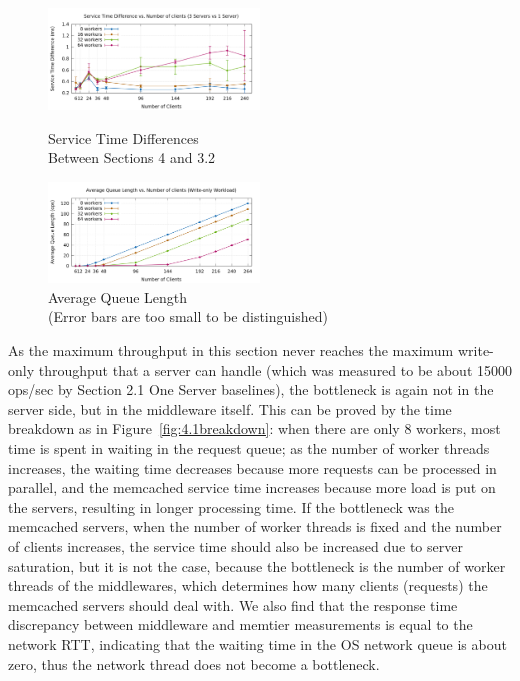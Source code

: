 \begin{figure}[!h]
\parbox{.5\linewidth}{
\centering
\includegraphics[width=0.5\textwidth]{img/4_servicediff.png}
\captionsetup{justification=centering}
\caption{\label{fig:4.1servicediff}Service Time Differences\\Between Sections 4 and 3.2}
}
\parbox{.5\linewidth}{
\centering
\includegraphics[width=0.5\textwidth]{img/4_queuelen.png}
\captionsetup{justification=centering}
\caption{\label{fig:4.1queue}Average Queue Length\\(Error bars are too small to be distinguished)}
}
\end{figure}

As the maximum throughput in this section never reaches the maximum write-only throughput that a server can handle (which was measured to be about 15000 ops/sec by Section 2.1 One Server baselines), the bottleneck is again not in the server side, but in the middleware itself. This can be proved by the time breakdown as in Figure~\ref{fig:4.1breakdown}: when there are only 8 workers, most time is spent in waiting in the request queue; as the number of worker threads increases, the waiting time decreases because more requests can be processed in parallel, and the memcached service time increases because more load is put on the servers, resulting in longer processing time. If the bottleneck was the memcached servers, when the number of worker threads is fixed and the number of clients increases, the service time should also be increased due to server saturation, but it is not the case, because the bottleneck is the number of worker threads of the middlewares, which determines how many clients (requests) the memcached servers should deal with. We also find that the response time discrepancy between middleware and memtier measurements is equal to the network RTT, indicating that the waiting time in the OS network queue is about zero, thus the network thread does not become a bottleneck.

